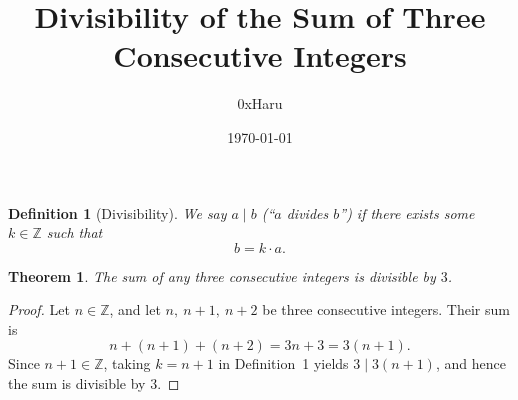 \documentclass[12pt]{article}
\title{\textbf{Divisibility of the Sum of Three Consecutive Integers}}
\author{0xHaru}
\date{\today}
\newtheorem{theorem}{Theorem}
\newtheorem{definition}{Definition}
\begin{document}
\maketitle

\begin{definition}[Divisibility]
    We say $a \mid b$ (\emph{``$a$ divides $b$''}) if there exists some $k \in \mathbb{Z}$ such that
    \[
        b = k \cdot a.
    \]
\end{definition}

\begin{theorem}
    The sum of any three consecutive integers is divisible by $3$.
\end{theorem}

\begin{proof}
    Let $n \in \mathbb{Z}$, and let $n,\ n+1,\ n+2$ be three consecutive integers. Their sum is
    \[
        n + (n+1) + (n+2) = 3n + 3 = 3(n+1).
    \]
    Since $n + 1 \in \mathbb{Z}$, taking $k = n + 1$ in Definition~1 yields $3 \mid 3(n+1)$, and hence the sum is divisible by $3$.
\end{proof}
\end{document}

